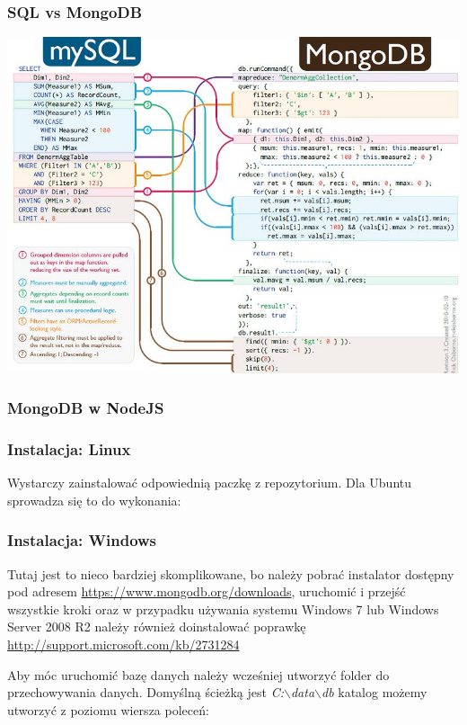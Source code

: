 \documentclass{beamer}
\begin{document}
  \begin{frame}
    \frametitle{SQL vs MongoDB}
    \includegraphics[width=\textwidth,keepaspectratio]{img/mysql_vs_mongodb.jpg}
  \end{frame}

  \begin{frame}
    \frametitle{MongoDB w NodeJS}
    
  \end{frame}

  \begin{frame}
    \frametitle{Instalacja: Linux}
    Wystarczy zainstalować odpowiednią paczkę z repozytorium. Dla Ubuntu sprowadza się to do wykonania:

    
  \end{frame}

  \begin{frame}
    \frametitle{Instalacja: Windows}
	Tutaj jest to nieco bardziej skomplikowane, bo należy pobrać instalator dostępny pod adresem \url{https://www.mongodb.org/downloads}, uruchomić i przejść wszystkie kroki oraz w przypadku używania systemu Windows 7 lub Windows Server 2008 R2 należy również doinstalować poprawkę \url{http://support.microsoft.com/kb/2731284}
	
	Aby móc uruchomić bazę danych należy wcześniej utworzyć folder do przechowywania danych. Domyślną ścieżką jest \emph{C:$\backslash$data$\backslash$db} katalog możemy utworzyć z poziomu wiersza poleceń:
	
	 
  \end{frame}
\end{document}

